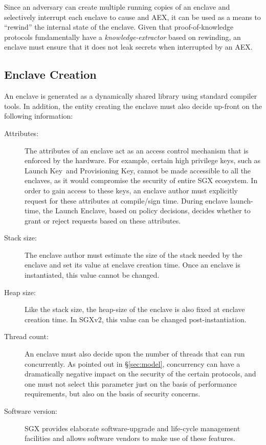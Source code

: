 \documentclass[letterpaper]{article}
\newcommand{\secref}[1]{\S\ref{#1}}
\newcommand{\aex}{\textsf{AEX}}
\newcommand{\launchenclave}{\textsf{Launch Enclave}}
\newcommand{\lk}{\textsf{Launch Key}}
\begin{document}
\begin{description}
    Since an adversary can create multiple running copies of an
    enclave and selectively interrupt each enclave to cause and \aex,
    it can be used as a means to ``rewind'' the internal state of the
    enclave. Given that proof-of-knowledge \cite{BellarePOK} protocols
    fundamentally have a \textit{knowledge-extractor} based on
    rewinding, an enclave must ensure that it does not leak secrets
    when interrupted by an \aex.

  \end{description}

  \subsection{Enclave Creation}
  \label{sec:enclavecreateion}
  An enclave is generated as a dynamically shared library using
  standard compiler tools. In addition, the entity creating the
  enclave must also decide up-front on the following information:

  \begin{description}
  \item[\textsf{Attributes}:] The attributes of an enclave act as an
    access control mechanism that is enforced by the hardware. For
    example, certain high privilege keys, such as \lk\ and
    \textsf{Provisioning Key}, cannot be made accessible to all the
    enclaves, as it would compromise the security of entire SGX
    ecosystem. In order to gain access to these keys, an enclave
    author must explicitly request for these attributes at
    compile/sign time. During enclave launch-time, the \launchenclave,
    based on policy decisions, decides whether to grant or reject
    requests based on these attributes.

  \item[\textsf{Stack size}:] The enclave author must estimate the
    size of the stack needed by the enclave and set its value at
    enclave creation time. Once an enclave is instantiated, this value
    cannot be changed.

  \item[\textsf{Heap size}:] Like the stack size, the heap-size of the
    enclave is also fixed at enclave creation time. In SGXv2, this
    value can be changed post-instantiation.

  \item[\textsf{Thread count}:] An enclave must also decide upon the
    number of threads that can run concurrently. As pointed out in
    \secref{sec:model}, concurrency can have a dramatically negative
    impact on the security of the certain protocols, and one must not
    select this parameter just on the basis of performance
    requirements, but also on the basis of security concerns.

  \item[\textsf{Software version}:] SGX provides elaborate
    software-upgrade and life-cycle management facilities and allows
    software vendors to make use of these features.

  \end{description}
\end{document}
